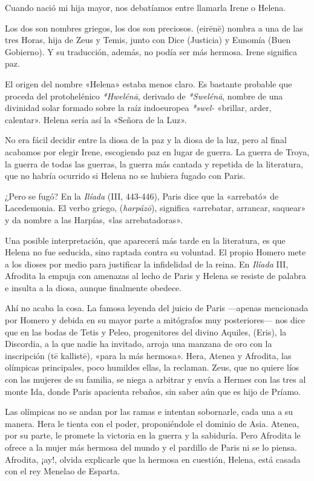 \label{cap:helena}

Cuando nació mi hija mayor, nos debatíamos entre llamarla Irene o Helena.

Los dos son nombres griegos, los dos son preciosos.  (eirēnē) nombra a una de las tres Horas, hija de Zeus y Temis, junto con Dice (Justicia) y Eunomía (Buen Gobierno). Y su traducción, además, no podía ser más hermosa. Irene significa paz.

El origen del nombre «Helena» estaba menos claro. Es bastante probable que proceda del protohelénico \emph{*Hwelénā}, derivado de \emph{*Swelénā}, nombre de una divinidad solar formado sobre la raíz indoeuropea \emph{*swel-} «brillar, arder, calentar». Helena sería así la «Señora de la Luz».

No era fácil decidir entre la diosa de la paz y la diosa de la luz, pero al final acabamos por elegir Irene, escogiendo paz en lugar de guerra. La guerra de Troya, la guerra de todas las guerras, la guerra más cantada y repetida de la literatura, que no habría ocurrido si Helena no se hubiera fugado con Paris.

¿Pero se fugó?
En la \emph{Ilíada} (III, 443-446), Paris dice que la «arrebató» de Lacedemonia. El verbo griego,  (\emph{harpázō}), significa «arrebatar, arrancar, saquear» y da nombre a las Harpías, «las arrebatadoras».

Una posible interpretación, que aparecerá más tarde en la literatura, es que Helena no fue seducida, sino raptada contra su voluntad. El propio Homero mete a los dioses por medio para justificar la infidelidad de la reina. En \emph{Ilíada} III, Afrodita la empuja con amenazas al lecho de Paris y Helena se resiste de palabra e insulta a la diosa, aunque finalmente obedece.

Ahí no acaba la cosa. La famosa leyenda del juicio de Paris ---apenas mencionada por Homero y debida en su mayor parte a mitógrafos muy posteriores--- nos dice que
en las bodas de Tetis y Peleo, progenitores del divino Aquiles,  (Eris), la Discordia, a la que nadie ha invitado, arroja una manzana de oro con la inscripción  (tē kallistē), «para la más hermosa». Hera, Atenea y Afrodita, las olímpicas principales, poco humildes ellas, la reclaman. Zeus, que no quiere líos con las mujeres de su familia, se niega a arbitrar y envía a Hermes con las tres al monte Ida, donde Paris apacienta rebaños, sin saber aún que es hijo de Príamo.

Las olímpicas no se andan por las ramas e intentan sobornarle, cada una a su manera. Hera le tienta con el poder, proponiéndole el dominio de Asia. Atenea, por su parte, le promete la victoria en la guerra y la sabiduría. Pero Afrodita le ofrece a la mujer más hermosa del mundo y el pardillo de Paris ni se lo piensa. Afrodita, ¡ay!, olvida explicarle que la hermosa en cuestión, Helena, está casada con el rey Menelao de Esparta.

